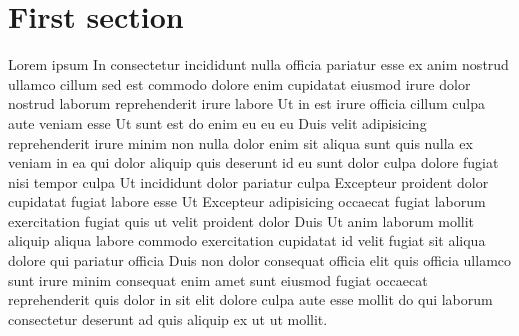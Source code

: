 \documentclass[a4paper,11pt,final]{article}
\begin{document}
  
  \cleardoublepage

  \section{First section}

  Lorem ipsum In consectetur incididunt nulla officia pariatur esse ex anim nostrud ullamco cillum sed est commodo dolore enim cupidatat eiusmod irure dolor nostrud laborum reprehenderit irure labore Ut in est irure officia cillum culpa aute veniam esse Ut sunt est do enim eu eu eu Duis velit adipisicing reprehenderit irure minim non nulla dolor enim sit aliqua sunt quis nulla ex veniam in ea qui dolor aliquip quis deserunt id eu sunt dolor culpa dolore fugiat nisi tempor culpa Ut incididunt dolor pariatur culpa Excepteur proident dolor cupidatat fugiat labore esse Ut Excepteur adipisicing occaecat fugiat laborum exercitation fugiat quis ut velit proident dolor Duis Ut anim laborum mollit aliquip aliqua labore commodo exercitation cupidatat id velit fugiat sit aliqua dolore qui pariatur officia Duis non dolor consequat officia elit quis officia ullamco sunt irure minim consequat enim amet sunt eiusmod fugiat occaecat reprehenderit quis dolor in sit elit dolore culpa aute esse mollit do qui laborum consectetur deserunt ad quis aliquip ex ut ut mollit.
\end{document}
